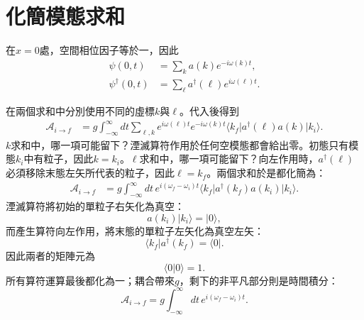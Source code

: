 \section{化簡模態求和}

在\(x=0\)處，空間相位因子等於一，因此
\begin{align}
\psi(0,t)&=\sum_k a(k)e^{-i\omega(k)t},\\
\psi^\dagger(0,t)&=\sum_\ell a^\dagger(\ell)e^{i\omega(\ell)t}.
\end{align}

\begin{classroomqa}
\end{classroomqa}

在兩個求和中分別使用不同的虛標\(k\)與\(\ell\)。代入後得到
\begin{align}
\mathcal A_{i\to f}
&=g\int_{-\infty}^{\infty}dt
\sum_{\ell,k}
e^{i\omega(\ell)t}e^{-i\omega(k)t}
\langle k_f\rvert a^\dagger(\ell)a(k)\lvert k_i\rangle.
\end{align}
\(k\)求和中，哪一項可能留下？湮滅算符作用於任何空模態都會給出零。初態只有模態\(k_i\)中有粒子，因此\(k=k_i\)。\(\ell\)求和中，哪一項可能留下？向左作用時，\(a^\dagger(\ell)\)必須移除末態左矢所代表的粒子，因此\(\ell=k_f\)。兩個求和於是都化簡為：
\begin{align}
\mathcal A_{i\to f}
&=g\int_{-\infty}^{\infty}dt\,
e^{i(\omega_f-\omega_i)t}
\langle k_f\rvert a^\dagger(k_f)a(k_i)\lvert k_i\rangle.
\end{align}
湮滅算符將初始的單粒子右矢化為真空：
\begin{equation}
a(k_i)\lvert k_i\rangle=\lvert0\rangle,
\end{equation}
而產生算符向左作用，將末態的單粒子左矢化為真空左矢：
\begin{equation}
\langle k_f\rvert a^\dagger(k_f)=\langle0\rvert.
\end{equation}
因此兩者的矩陣元為
\begin{equation}
\langle0\vert0\rangle=1.
\end{equation}
所有算符運算最後都化為一；耦合帶來\(g\)，剩下的非平凡部分則是時間積分：
\begin{equation}
\mathcal A_{i\to f}
=g\int_{-\infty}^{\infty}dt\,
e^{i(\omega_f-\omega_i)t}.
\end{equation}



